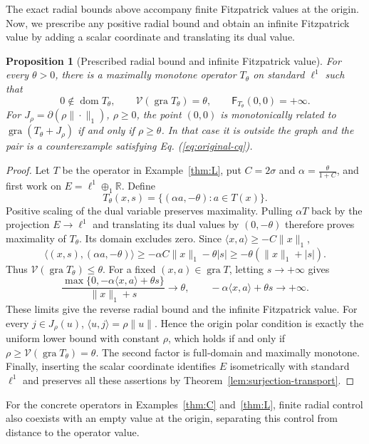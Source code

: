 \documentclass[11pt]{article}
\newcommand{\R}{\mathbb R}
\newcommand{\gra}{\operatorname{gra}}
\newcommand{\dom}{\operatorname{dom}}
\newcommand{\pair}[2]{\langle #1,#2\rangle}
\newtheorem{proposition}{Proposition}
\theoremstyle{definition}
\theoremstyle{remark}
\begin{document}
The exact radial bounds above accompany finite Fitzpatrick values at the origin. Now, we prescribe any positive radial bound and obtain an infinite Fitzpatrick value by adding a scalar coordinate and translating its dual value.

\begin{proposition}[Prescribed radial bound and infinite Fitzpatrick value]
\label{cor:radial-infinite-fitzpatrick}
For every $\theta>0$, there is a maximally monotone operator $T_\theta$ on standard $\ell^1$ such that
\[
0\notin\dom T_\theta,\qquad
\mathcal V(\gra T_\theta)=\theta,\qquad
\mathsf F_{T_\theta}(0,0)=+\infty.
\]
For $J_\rho=\partial(\rho\|\cdot\|_1)$, $\rho\ge0$, the point $(0,0)$ is monotonically related to $\gra(T_\theta+J_\rho)$ if and only if $\rho\ge\theta$. In that case it is outside the graph and the pair is a counterexample satisfying Eq. (\ref{eq:original-cq}).
\end{proposition}
\begin{proof}
Let $T$ be the operator in Example~\ref{thm:L}, put $C=2\sigma$ and $\alpha=\frac{\theta}{1+C}$, and first work on $E=\ell^1\oplus_1\R$. Define
\[
T_\theta(x,s)=\{(\alpha a,-\theta):a\in T(x)\}.
\]
Positive scaling of the dual variable preserves maximality. Pulling $\alpha T$ back by the projection $E\to\ell^1$ and translating its dual values by $(0,-\theta)$ therefore proves maximality of $T_\theta$. Its domain excludes zero. Since $\pair{x}{a}\ge-C\|x\|_1$,
\[
\pair{(x,s)}{(\alpha a,-\theta)}
\ge-\alpha C\|x\|_1-\theta|s|
\ge-\theta(\|x\|_1+|s|).
\]
Thus $\mathcal V(\gra T_\theta)\le\theta$. For a fixed $(x,a)\in\gra T$, letting $s\to+\infty$ gives
\[
\frac{\max\{0,-\alpha\pair{x}{a}+\theta s\}}{\|x\|_1+s}\longrightarrow\theta,
\qquad
-\alpha\pair{x}{a}+\theta s\longrightarrow+\infty.
\]
These limits give the reverse radial bound and the infinite Fitzpatrick value. For every $j\in J_\rho(u)$, $\pair{u}{j}=\rho\|u\|$. Hence the origin polar condition is exactly the uniform lower bound with constant $\rho$, which holds if and only if $\rho\ge\mathcal V(\gra T_\theta)=\theta$. The second factor is full-domain and maximally monotone. Finally, inserting the scalar coordinate identifies $E$ isometrically with standard $\ell^1$ and preserves all these assertions by Theorem~\ref{lem:surjection-transport}.
\end{proof}

For the concrete operators in Examples~\ref{thm:C} and~\ref{thm:L}, finite radial control also coexists with an empty value at the origin, separating this control from distance to the operator value.
\end{document}
